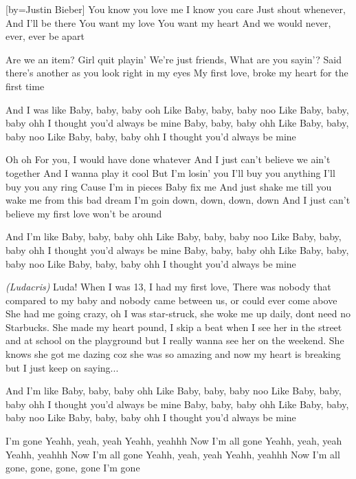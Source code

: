[by={Justin Bieber}]
\beginverse
{} 
You know you love me
I know you care
Just shout whenever,
And I'll be there
You want my love
You want my heart
And we would never, ever, ever be apart
\endverse

\beginverse
Are we an item?
Girl quit playin'
We're just friends,
What are you sayin'?
Said there's another as you look right in my eyes
My first love, broke my heart for the first time
\endverse 

\beginchorus
And I was like
Baby, baby, baby ooh
Like
Baby, baby, baby noo
Like
Baby, baby, baby ohh
I thought you'd always be mine 
Baby, baby, baby ohh
Like
Baby, baby, baby noo
Like
Baby, baby, baby ohh
I thought you'd always be mine 
\endchorus

\beginverse 
Oh oh For you, I would have done whatever
And I just can't believe we ain't together
And I wanna play it cool
But I'm losin' you
I'll buy you anything
I'll buy you any ring
Cause I'm in pieces
Baby fix me
And just shake me till you wake me from this bad dream
I'm goin down, down, down, down
And I just can't believe my first love won't be around
\endverse

\beginchorus
And I'm like
Baby, baby, baby ohh
Like
Baby, baby, baby noo
Like
Baby, baby, baby ohh
I thought you'd always be mine 
Baby, baby, baby ohh
Like
Baby, baby, baby noo
Like
Baby, baby, baby ohh
I thought you'd always be mine 
\endchorus
 
\beginverse
\textit{(Ludacris)}
Luda! When I was 13, I had my first love,
There was nobody that compared to my baby
and nobody came between us, or could ever come above
She had me going crazy, oh I was star-struck,
she woke me up daily, dont need no Starbucks.
She made my heart pound, I skip a beat when I see her in the street and
at school on the playground but I really wanna see her on the weekend.
She knows she got me dazing coz she was so amazing
and now my heart is breaking but I just keep on saying...
\endverse

\beginchorus
And I'm like
Baby, baby, baby ohh
Like
Baby, baby, baby noo
Like
Baby, baby, baby ohh
I thought you'd always be mine 
Baby, baby, baby ohh
Like
Baby, baby, baby noo
Like
Baby, baby, baby ohh
I thought you'd always be mine 
\endchorus

\beginverse 
I'm gone
Yeahh, yeah, yeah
Yeahh, yeahhh
Now I'm all gone
Yeahh, yeah, yeah
Yeahh, yeahhh
Now I'm all gone
Yeahh, yeah, yeah
Yeahh, yeahhh
Now I'm all gone, gone, gone, gone
I'm gone	
\endverse
\endsong